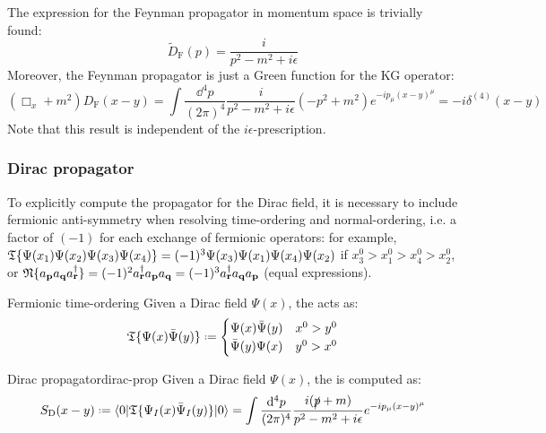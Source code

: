 The expression for the Feynman propagator in momentum space is trivially found:
\begin{equation}
  \tilde{D}_\text{F}(p) = \frac{i}{p^2 - m^2 + i\epsilon}
\end{equation}
Moreover, the Feynman propagator is just a Green function for the KG operator:
\begin{equation*}
  (\Box_x + m^2) D_\text{F}(x-y) = \int \frac{\dd^4p}{(2\pi)^4} \frac{i}{p^2 - m^2 + i\epsilon} (-p^2 + m^2) e^{-i p_\mu (x-y)^\mu} = -i \delta^{(4)}(x-y)
\end{equation*}
Note that this result is independent of the $ i\epsilon $-prescription.

\subsubsection{Dirac propagator}

To explicitly compute the propagator for the Dirac field, it is necessary to include fermionic anti-symmetry when resolving time-ordering and normal-ordering, i.e. a factor of $ (-1) $ for each exchange of fermionic operators: for example, $ \mathfrak{T}\{\Psi(x_1) \Psi(x_2) \Psi(x_3) \Psi(x_4)\} = (-1)^3 \Psi(x_3) \Psi(x_1) \Psi(x_4) \Psi(x_2) $ if $ x_3^0 > x_1^0 > x_4^0 > x_2^0 $, or $ \mathfrak{N}\{a_{\mathbf{p}} a_{\mathbf{q}} a_{\mathbf{r}}^\dagger\} = (-1)^2 a_{\mathbf{r}}^\dagger a_{\mathbf{p}} a_{\mathbf{q}} = (-1)^3 a_{\mathbf{r}}^\dagger a_{\mathbf{q}} a_{\mathbf{p}} $ (equal expressions).

\begin{definition}{Fermionic time-ordering}{}
  Given a Dirac field $ \Psi(x) $, the  acts as:
  \begin{equation}
    \tempord\{\Psi(x) \bar{\Psi}(y)\} \defeq
    \begin{cases}
      \Psi(x) \bar{\Psi}(y) & x^0 > y^0 \\
      \bar{\Psi}(y) \Psi(x) & y^0 > x^0 \\
    \end{cases}
  \end{equation}
\end{definition}

\begin{theorem}{Dirac propagator}{dirac-prop}
  Given a Dirac field $ \Psi(x) $, the  is computed as:
  \begin{equation}
    S_\text{D}(x - y) \defeq \braket{0 | \tempord\{\Psi_I(x) \bar{\Psi}_I(y)\} | 0} = \int \frac{\dd^4p}{(2\pi)^4} \frac{i (\slashed{p} + m)}{p^2 - m^2 + i\epsilon} e^{-i p_\mu (x - y)^\mu}
    \label{eq:dirac-prop}
  \end{equation}
\end{theorem}

